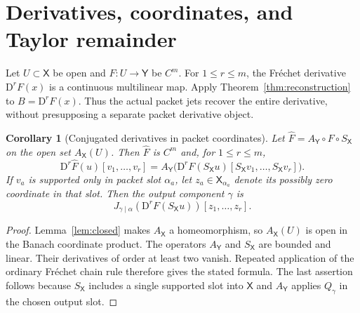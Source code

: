 \documentclass[11pt]{article}
\newtheorem{corollary}[theorem]{Corollary}
\theoremstyle{remark}\newtheorem{remark}[theorem]{Remark}
\newcommand{\X}{\mathsf X}\newcommand{\Y}{\mathsf Y}\newcommand{\Z}{\mathsf Z}
\newcommand{\D}{\mathrm D}
\begin{document}
\section{Derivatives, coordinates, and Taylor remainder}
Let $U\subset\X$ be open and $F:U\to\Y$ be $C^m$. For $1\le r\le m$, the Fr\'echet derivative $\D^rF(x)$ is a continuous multilinear map. Apply Theorem~\ref{thm:reconstruction} to $B=\D^rF(x)$. Thus the actual packet jets recover the entire derivative, without presupposing a separate packet derivative object.

\begin{corollary}[Conjugated derivatives in packet coordinates]\label{cor:conj}
Let $\widehat F=A_{\Y}\circ F\circ S_{\X}$ on the open set $A_{\X}(U)$. Then $\widehat F$ is $C^m$ and, for $1\le r\le m$,
\[
\D^r\widehat F(u)[v_1,\ldots,v_r]
=A_{\Y}\big(\D^rF(S_{\X}u)[S_{\X}v_1,\ldots,S_{\X}v_r]\big).
\]
If $v_a$ is supported only in packet slot $\alpha_a$, let $z_a\in\X_{\alpha_a}$ denote its possibly zero coordinate in that slot. Then the output component $\gamma$ is
\[
J_{\gamma\mid\alpha}(\D^rF(S_{\X}u))[z_1,\ldots,z_r].
\]
\end{corollary}
\begin{proof}
Lemma~\ref{lem:closed} makes $A_{\X}$ a homeomorphism, so $A_{\X}(U)$ is open in the Banach coordinate product. The operators $A_{\Y}$ and $S_{\X}$ are bounded and linear. Their derivatives of order at least two vanish. Repeated application of the ordinary Fr\'echet chain rule therefore gives the stated formula. The last assertion follows because $S_{\X}$ includes a single supported slot into $\X$ and $A_{\Y}$ applies $Q_\gamma$ in the chosen output slot.
\end{proof}
\end{document}
